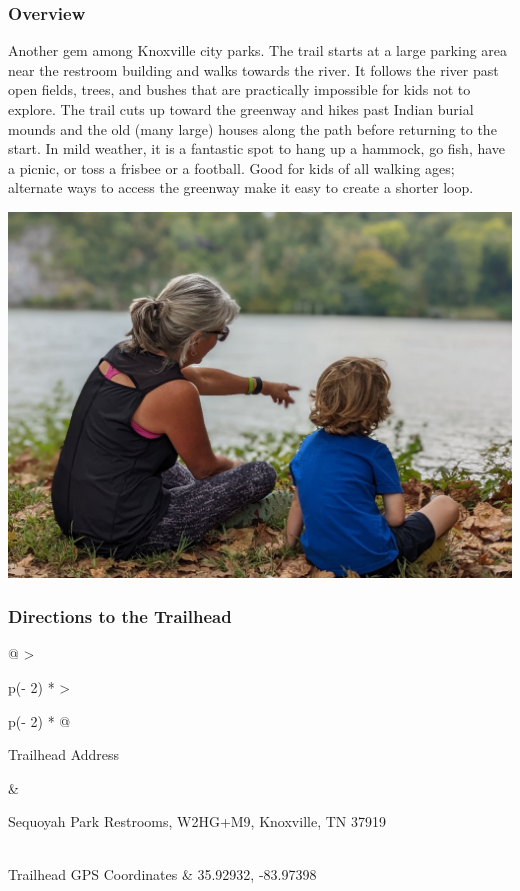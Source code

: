 \documentclass[
  letterpaper,
  DIV=11,
  numbers=noendperiod]{scrartcl}
\begin{document}
\hypertarget{overview-6}{%
\subsubsection{Overview}\label{overview-6}}

Another gem among Knoxville city parks. The trail starts at a large
parking area near the restroom building and walks towards the river. It
follows the river past open fields, trees, and bushes that are
practically impossible for kids not to explore. The trail cuts up toward
the greenway and hikes past Indian burial mounds and the old (many
large) houses along the path before returning to the start. In mild
weather, it is a fantastic spot to hang up a hammock, go fish, have a
picnic, or toss a frisbee or a football. Good for kids of all walking
ages; alternate ways to access the greenway make it easy to create a
shorter loop.

\includegraphics{img/trail-07-figure-01.jpg}

\hypertarget{directions-to-the-trailhead-6}{%
\subsubsection{Directions to the
Trailhead}\label{directions-to-the-trailhead-6}}

\begin{longtable}[]{@{}
  >{\raggedright\arraybackslash}p{(\columnwidth - 2\tabcolsep) * }
  >{\raggedright\arraybackslash}p{(\columnwidth - 2\tabcolsep) * }@{}}
\toprule\noalign{}
\begin{minipage}[b]{\linewidth}\raggedright
Trailhead Address
\end{minipage} & \begin{minipage}[b]{\linewidth}\raggedright
Sequoyah Park Restrooms, W2HG+M9, Knoxville, TN 37919
\end{minipage} \\
\midrule\noalign{}
\endhead
\bottomrule\noalign{}
\endlastfoot
Trailhead GPS Coordinates & 35.92932, -83.97398 \\
\end{longtable}
\end{document}
